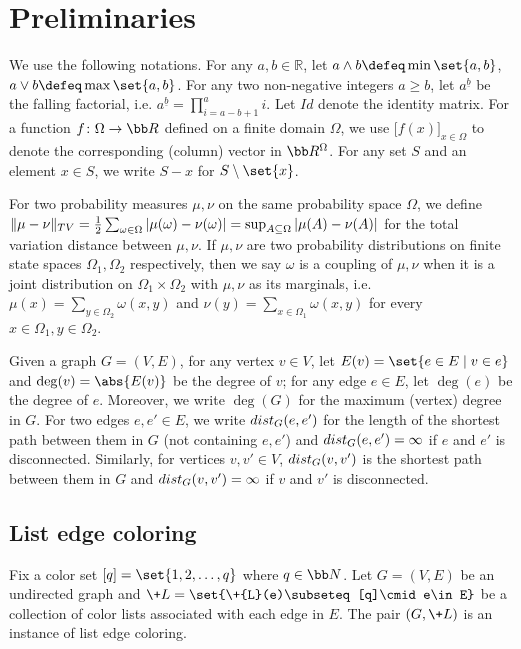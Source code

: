 \newcommand{\dist}{\-{dist}}

\section{Preliminaries}\label{sec:prelim}
We use the following notations. For any $a, b\in \mathbb R$, let $
    a\wedge b\defeq \min\set{a, b}$, $
    a\vee b\defeq \max\set{a, b}$. For any two non-negative integers $a\ge b$, let $a^{\underline{b}}$ be the falling factorial, i.e. $a^{\underline{b}}=\prod_{i=a-b+1}^a i$.
Let $\!{Id}$ denote the identity matrix. For a function $f\colon \Omega\to\bb R$ defined on a finite domain $\Omega$, we use $\Big[f(x)\Big]_{x\in\Omega}$ to denote the corresponding (column) vector in $\bb R^{\Omega}$. For any set $S$ and an element $x\in S$, we write $S-x$ for $S\setminus \set{x}$.

For two probability measures $\mu, \nu$ on the same probability space $\Omega$, we define $\|\mu-\nu\|_{\-{TV}}=\frac{1}{2} \sum_{\omega \in \Omega}|\mu(\omega)-\nu(\omega)|=\sup _{A \subseteq \Omega}|\mu(A)-\nu(A)|$ for the total variation distance between $\mu, \nu$. If $\mu, \nu$ are two probability distributions on finite state spaces $\Omega_1, \Omega_2$ respectively, then we say $\omega$ is a coupling of $\mu, \nu$ when it is a joint distribution on $\Omega_1 \times \Omega_2$ with $\mu, \nu$ as its marginals, i.e. $\mu(x)=\sum_{y \in \Omega_2} \omega(x, y)$ and $\nu(y)=\sum_{x \in \Omega_1} \omega(x, y)$ for every $x \in \Omega_1, y \in \Omega_2$.%

Given a graph $G=(V,E)$, for any vertex $v\in V$, let $E(v)= \set{e\in E \mid  v\in e}$ and $\deg(v)=\abs{E(v)}$ be the degree of $v$; for any edge $e \in E$, let $\deg(e)$ be the degree of $e$. Moreover, we write $\deg(G)$ for the maximum (vertex) degree in $G$.
For  two edges $e,e'\in E$, we write $\dist_G(e, e')$ for the length of the shortest path between them in $G$ (not containing $e,e'$) and $\dist_G(e, e') = \infty$ if $e$ and $e'$ is disconnected. 
Similarly, for vertices $v,v'\in V$, $\dist_G(v,v')$ is the shortest path between them in $G$ and $\dist_G(v, v') = \infty$ if $v$ and $v'$ is disconnected.

\subsection{List edge coloring}
Fix a color set $[q]=\set{1, 2, \dots, q}$ where $q\in\bb N$. Let $G=(V,E)$ be an undirected graph and $\+L=\set{\+{L}(e)\subseteq[q]\cmid e\in E}$ be a collection of color lists associated with each edge in $E$. The pair $(G, \+L)$  is an instance of list edge coloring. 

